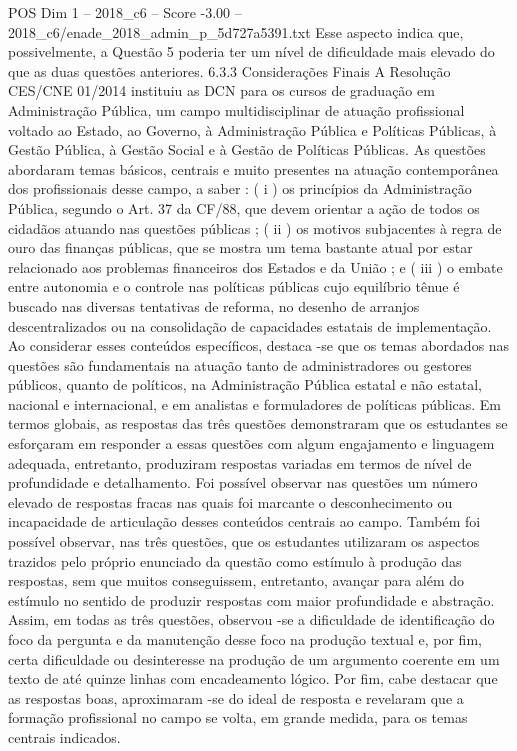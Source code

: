 \begin{textsample}{POS Dim 1 – 2018\_c6 – Score -3.00 – 2018\_c6/enade\_2018\_admin\_p\_5d727a5391.txt}
Esse aspecto indica que, possivelmente, a Questão 5 poderia ter um nível de dificuldade mais elevado do que as duas questões anteriores. 6.3.3 Considerações Finais A Resolução CES/CNE 01/2014 instituiu as DCN para os cursos de graduação em Administração Pública, um campo multidisciplinar de atuação profissional voltado ao Estado, ao Governo, à Administração Pública e Políticas Públicas, à Gestão Pública, à Gestão Social e à Gestão de Políticas Públicas.
As questões abordaram temas básicos, centrais e muito presentes na atuação contemporânea dos profissionais desse campo, a saber : ( i ) os princípios da Administração Pública, segundo o Art. 37 da CF/88, que devem orientar a ação de todos os cidadãos atuando nas questões públicas ; ( ii ) os motivos subjacentes à regra de ouro das finanças públicas, que se mostra um tema bastante atual por estar relacionado aos problemas financeiros dos Estados e da União ; e ( iii ) o embate entre autonomia e o controle nas políticas públicas cujo equilíbrio tênue é buscado nas diversas tentativas de reforma, no desenho de arranjos descentralizados ou na consolidação de capacidades estatais de implementação.
Ao considerar esses conteúdos específicos, destaca -se que os temas abordados nas questões são fundamentais na atuação tanto de administradores ou gestores públicos, quanto de políticos, na Administração Pública estatal e não estatal, nacional e internacional, e em analistas e formuladores de políticas públicas.
Em termos globais, as respostas das três questões demonstraram que os estudantes se esforçaram em responder a essas questões com algum engajamento e linguagem adequada, entretanto, produziram respostas variadas em termos de nível de profundidade e detalhamento.
Foi possível observar nas questões um número elevado de respostas fracas nas quais foi marcante o desconhecimento ou incapacidade de articulação desses conteúdos centrais ao campo.
Também foi possível observar, nas três questões, que os estudantes utilizaram os aspectos trazidos pelo próprio enunciado da questão como estímulo à produção das respostas, sem que muitos conseguissem, entretanto, avançar para além do estímulo no sentido de produzir respostas com maior profundidade e abstração.
Assim, em todas as três questões, observou -se a dificuldade de identificação do foco da pergunta e da manutenção desse foco na produção textual e, por fim, certa dificuldade ou desinteresse na produção de um argumento coerente em um texto de até quinze linhas com encadeamento lógico.
Por fim, cabe destacar que as respostas boas, aproximaram -se do ideal de resposta e revelaram que a formação profissional no campo se volta, em grande medida, para os temas centrais indicados.

\end{textsample}
